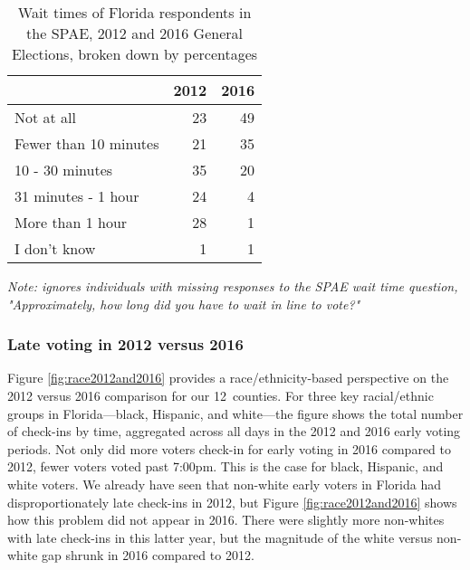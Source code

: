 \documentclass[12pt,titlepage]{article}
\newcommand{\numcounties}{12}
\begin{document}
\begin{table}[ht]
\centering
\caption{Wait times of Florida respondents in the SPAE, 2012 and 2016
  General Elections, broken down by percentages} 
\label{tab:floridaspae}
\begin{tabular}{lrr}
  \hline
 & 2012 & 2016 \\ 
  \hline
  Not at all &  23 &  49 \\ 
  Fewer than 10 minutes &  21 &  35 \\ 
  10 - 30 minutes &  35 &  20 \\ 
  31 minutes - 1 hour &  24 &   4 \\ 
  More than 1 hour &  28 &   1 \\ 
  I don't know &   1 &   1 \\ 
   \hline
\end{tabular}
\begin{flushleft}
  \emph{Note: ignores individuals with missing responses to the SPAE
    wait time question, "Approximately, how long did you have to wait
    in line to vote?"}
\end{flushleft}
\end{table}

% 

\subsubsection*{Late voting in 2012 versus 2016}

Figure \ref{fig:race2012and2016} provides a race/ethnicity-based
perspective on the 2012 versus 2016 comparison for our \numcounties\
counties.  For three key racial/ethnic groups in Florida---black,
Hispanic, and white---the figure shows the total number of check-ins
by time, aggregated across all days in the 2012 and 2016 early voting
periods.  Not only did more voters check-in for early voting in 2016
compared to 2012, fewer voters voted past 7:00pm. This is the case for
black, Hispanic, and white voters. We already have seen that non-white
early voters in Florida had disproportionately late check-ins in 2012,
but Figure \ref{fig:race2012and2016} shows how this problem did not
appear in 2016. There were slightly more non-whites with late
check-ins in this latter year, but the magnitude of the white versus
non-white gap shrunk in 2016 compared to 2012.
\end{document}

